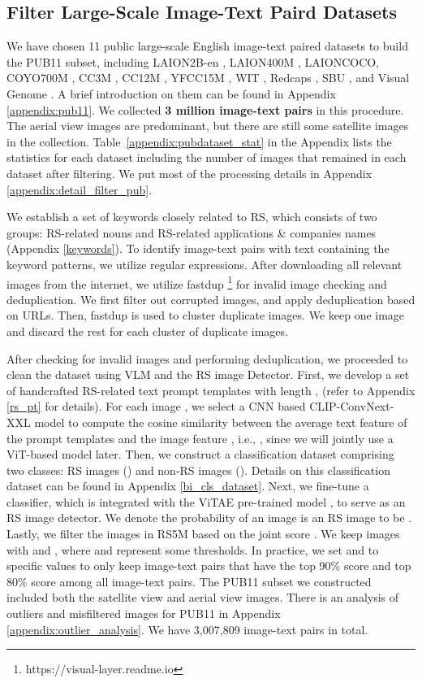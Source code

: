 \documentclass[journal]{IEEEtran}
\begin{document}
\subsection{Filter Large-Scale Image-Text Paird Datasets}
\label{pub11}

We have chosen 11 public large-scale English image-text paired datasets to build the PUB11 subset, including LAION2B-en \cite{laion5b}, LAION400M \cite{laion400m}, LAIONCOCO, COYO700M \cite{coyo700m}, CC3M \cite{cc3m}, CC12M \cite{cc12m}, YFCC15M \cite{yfcc100m}, WIT \cite{wit}, Redcaps \cite{redcaps}, SBU \cite{sbu}, and Visual Genome \cite{vg}. A brief introduction on them can be found in Appendix \ref{appendix:pub11}. We collected \textbf{3 million image-text pairs} in this procedure. The aerial view images are predominant, but there are still some satellite images in the collection. Table~\ref{appendix:pubdataset_stat} in the Appendix lists the statistics for each dataset including the number of images that remained in each dataset after filtering. We put most of the processing details in Appendix \ref{appendix:detail_filter_pub}. 

We establish a set of keywords closely related to RS, which consists of two groups: RS-related nouns and RS-related applications \& companies names (Appendix \ref{keywords}). To identify image-text pairs with text containing the keyword patterns, we utilize regular expressions. After downloading all relevant images from the internet, we utilize fastdup \footnote{https://visual-layer.readme.io} for invalid image checking and deduplication. We first filter out corrupted images, and apply deduplication based on URLs. Then, fastdup is used to cluster duplicate images. We keep one image and discard the rest for each cluster of duplicate images. 

After checking for invalid images and performing deduplication, we proceeded to clean the dataset using VLM and the RS image Detector. First, we develop a set of handcrafted RS-related text prompt templates with length ,  (refer to Appendix \ref{rs_pt} for details). For each image , we select a CNN based CLIP-ConvNext-XXL model \cite{openclip} to compute the cosine similarity  between the average text feature  of the prompt templates and the image feature , i.e., , since we will jointly use a ViT-based model later. Then, we construct a classification dataset comprising two classes: RS images () and non-RS images (). Details on this classification dataset can be found in Appendix \ref{bi_cls_dataset}. Next, we fine-tune a classifier, which is integrated with the ViTAE pre-trained model \cite{wang2022advancing}, to serve as an RS image detector. We denote the probability of an image  is an RS image to be . Lastly, we filter the images in RS5M based on the joint score . We keep images with  and , where  and  represent some thresholds. In practice, we set  and  to specific values to only keep image-text pairs that have the top 90\%  score and top 80\%  score among all image-text pairs. The PUB11 subset we constructed included both the satellite view and aerial view images. There is an analysis of outliers and misfiltered images for PUB11 in Appendix \ref{appendix:outlier_analysis}. We have 3,007,809 image-text pairs in total.
\end{document}
